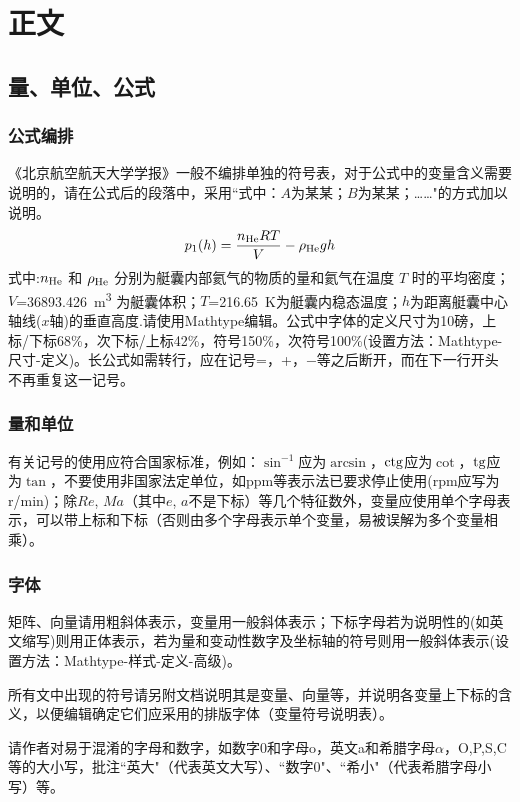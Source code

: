 \documentclass[10.5pt,twocolumn]{jbuaa}
\begin{document}
\section{正文}
\subsection{量、单位、公式}
\subsubsection{公式编排}
\label{labSecForm}
《北京航空航天大学学报》一般不编排单独的符号表，对于公式中的变量含义需要说明的，请在公式后的段落中，采用``式中：$A$为某某；$B$为某某；……"的方式加以说明。
\begin{equation}
\label{eqnLabelp}
p_1 (h) = \dfrac{n_{\textnormal{He}}RT}{V}-\rho_{\textnormal{He}}gh
\end{equation}
式中:$n_{\textnormal{He}}$ 和 $\rho_{\textnormal{He}}$ 分别为艇囊内部氦气的物质的量和氦气在温度 $T$ 时的平均密度；
$V$=\SI{36893.426}{\cubic\meter}%
为艇囊体积；$T$=\SI{216.65}{\kelvin}为艇囊内稳态温度；$h$为距离艇囊中心轴线($x$轴)的垂直高度.请使用Mathtype编辑。公式中字体的定义尺寸为10磅，上标/下标68\%，次下标/上标42\%，符号150\%，次符号100\%(设置方法：Mathtype-尺寸-定义)。长公式如需转行，应在记号=，+，$-$等之后断开，而在下一行开头不再重复这一记号。

\subsubsection{量和单位}
有关记号的使用应符合国家标准，例如：$\sin^{-1}$应为$\arcsin$，$\rm ctg$应为$\cot$，$\rm tg$应为$\tan$，不要使用非国家法定单位，如ppm等表示法已要求停止使用(rpm应写为r/min)；除$Re$, $Ma$（其中$e$, $a$不是下标）等几个特征数外，变量应使用单个字母表示，可以带上标和下标（否则由多个字母表示单个变量，易被误解为多个变量相乘）。

\subsubsection{字体}
矩阵、向量请用粗斜体表示，变量用一般斜体表示；下标字母若为说明性的(如英文缩写)则用正体表示，若为量和变动性数字及坐标轴的符号则用一般斜体表示(设置方法：Mathtype-样式-定义-高级)。

所有文中出现的符号请另附文档说明其是变量、向量等，并说明各变量上下标的含义，以便编辑确定它们应采用的排版字体（变量符号说明表）。

请作者对易于混淆的字母和数字，如数字0和字母o，英文a和希腊字母$\alpha$，O,P,S,C等的大小写，批注``英大"（代表英文大写）、``数字0"、``希小"（代表希腊字母小写）等。
\end{document}
